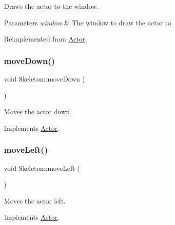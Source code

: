Draws the actor to the window. 


\begin{DoxyParams}{Parameters}
{\em window} & The window to draw the actor to \\
\hline
\end{DoxyParams}


Reimplemented from \mbox{\hyperlink{classActor_af73a6f6670f0507c9e55ec2f61293535}{Actor}}.

\mbox{\label{classSkeleton_aee2055fa3d1db80392b365aa40c878bf}} 
\subsubsection{\texorpdfstring{moveDown()}{moveDown()}}
{\footnotesize\ttfamily void Skeleton\+::move\+Down (\begin{DoxyParamCaption}{ }\end{DoxyParamCaption})\hspace{0.3cm}{\ttfamily [virtual]}}



Moves the actor down. 



Implements \mbox{\hyperlink{classActor_ad2737cd62ea0c96f75853afb5d1fd83a}{Actor}}.

\mbox{\label{classSkeleton_ab03c65cdabc94f280443691653112d3a}} 
\subsubsection{\texorpdfstring{moveLeft()}{moveLeft()}}
{\footnotesize\ttfamily void Skeleton\+::move\+Left (\begin{DoxyParamCaption}{ }\end{DoxyParamCaption})\hspace{0.3cm}{\ttfamily [virtual]}}



Moves the actor left. 



Implements \mbox{\hyperlink{classActor_a522d6069bacaa9985db7a234bde2c8b6}{Actor}}.

\mbox{\label{classSkeleton_a3d8ce7b8a1d10e4a33a27f0eee54042e}} 
